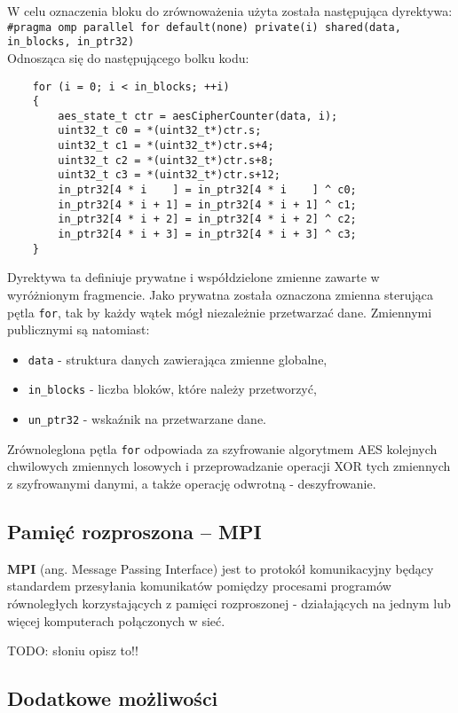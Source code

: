 \documentclass[a4paper,12pt]{article}
\begin{document}
W celu oznaczenia bloku do zrównoważenia użyta została następująca dyrektywa: \\
 \texttt{\#pragma omp parallel for default(none) private(i) shared(data, in\_blocks, in\_ptr32)}\\
Odnosząca się do następującego bolku kodu:\\
\begin{lstlisting}
	for (i = 0; i < in_blocks; ++i)
	{
		aes_state_t ctr = aesCipherCounter(data, i);
		uint32_t c0 = *(uint32_t*)ctr.s;
		uint32_t c1 = *(uint32_t*)ctr.s+4;
		uint32_t c2 = *(uint32_t*)ctr.s+8;
		uint32_t c3 = *(uint32_t*)ctr.s+12;
		in_ptr32[4 * i    ] = in_ptr32[4 * i    ] ^ c0;
		in_ptr32[4 * i + 1] = in_ptr32[4 * i + 1] ^ c1;
		in_ptr32[4 * i + 2] = in_ptr32[4 * i + 2] ^ c2;
		in_ptr32[4 * i + 3] = in_ptr32[4 * i + 3] ^ c3;
	}
\end{lstlisting}

Dyrektywa ta definiuje prywatne i współdzielone zmienne zawarte w wyróżnionym fragmencie. Jako prywatna została oznaczona zmienna sterująca pętla \texttt{for}, tak by każdy wątek mógł niezależnie przetwarzać dane. Zmiennymi publicznymi są natomiast:
\begin{itemize}
\item \texttt{data} - struktura danych zawierająca zmienne globalne,
\item \texttt{in\_blocks} - liczba bloków, które należy przetworzyć,
\item \texttt{un\_ptr32} - wskaźnik na przetwarzane dane.
\end{itemize}

Zrównoleglona pętla  \texttt{for} odpowiada za szyfrowanie algorytmem AES kolejnych chwilowych zmiennych losowych i przeprowadzanie operacji XOR tych zmiennych z szyfrowanymi danymi, a także operację odwrotną - deszyfrowanie.

\subsection{Pamięć rozproszona -- MPI}
\textbf{MPI} (ang. Message Passing Interface) jest to protokół komunikacyjny będący standardem przesyłania komunikatów pomiędzy procesami programów równoległych korzystających z pamięci rozproszonej - działających na jednym lub więcej komputerach połączonych w sieć. 

TODO: słoniu opisz to!!

\subsection{Dodatkowe możliwości}
\end{document}
